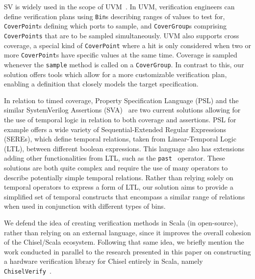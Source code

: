 \documentclass[conference]{IEEEtran}
\begin{document}
SV is widely used in the scope of UVM~\cite{uvm2015}. 
In UVM, verification engineers can define verification plans using \texttt{Bin}s describing ranges of values to test for, \texttt{CoverPoint}s defining which ports to sample, and \texttt{CoverGroup}s comprising \texttt{CoverPoints} that are to be sampled simultaneously. 
UVM also supports cross coverage, a special kind of \texttt{CoverPoint} where a hit is only considered when two or more \texttt{CoverPoint}s have specific values at the same time.
Coverage is sampled whenever the \texttt{sample} method is called on a \texttt{CoverGroup}. 
In contrast to this, our solution offers tools which allow for a more customizable verification plan, enabling a definition that closely models the target specification.

In relation to timed coverage, Property Specification Language (PSL) and the similar SystemVerilog Assertions (SVA)~\cite{Boule2008} are two current solutions allowing for the use of temporal logic in relation to both coverage and assertions. 
PSL for example offers a wide variety of Sequential-Extended Regular Expressions (SEREs), which define temporal relations, taken from Linear-Temporal Logic (LTL), between different boolean expressions. This language also has extensions adding other functionalities from LTL, such as the \texttt{past}~\cite{Dax2010:temporal-logics} operator. These solutions are both quite complex and require the use of many operators to describe potentially simple temporal relations. Rather than relying solely on temporal operators to express a form of LTL, our solution aims to provide a simplified set of temporal constructs that encompass a similar range of relations when used in conjunction with different types of bins. %

We defend the idea of creating verification methods in Scala (in open-source), rather than relying on an external language, since it improves the overall cohesion of the Chisel/Scala ecosystem. 
Following that same idea, we briefly mention the work conducted in parallel to the research presented in this paper on constructing a hardware verification library for Chisel entirely in Scala, namely \texttt{ChiselVerify}~\cite{ChiselVerify:dobis2021}.
\end{document}
